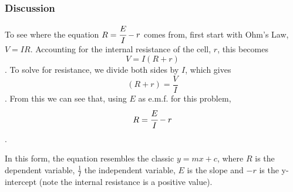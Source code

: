 \subsubsection{Discussion}
To see where the equation $R=\cfrac{E}{I}-r$ comes from, first start with Ohm's Law, $V = IR$. Accounting for the internal resistance of the cell, $r$, this becomes $$V = I(R + r)$$. To solve for resistance, we divide both sides by $I$, which gives $$(R + r) = \frac{V}{I}$$. From this we can see that, using $E$ as e.m.f. for this problem, $$R=\cfrac{E}{I}-r $$. 

In this form, the equation resembles the classic $y = mx + c$, where $R$ is the dependent variable, $\frac{1}{I}$ the independent variable, $E$ is the slope and $-r$ is the y-intercept (note the internal resistance is a positive value).

%
%
%
%
%
%
%
%

